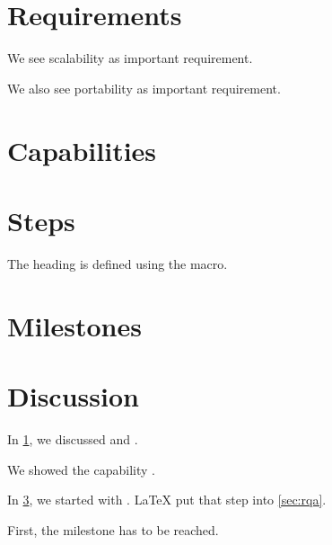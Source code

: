 \documentclass{article}
\begin{document}
\tableofcontents
\clearpage






\section{Requirements}
\label{secreqs}
We see scalability as important requirement.

We also see portability as important requirement.


\section{Capabilities}


\section{Steps}
\label{sec:steps}

\label{sec:rqa}
The heading is defined using the macro.

\section{Milestones}

\clearpage


\section{Discussion}
In \cref{secreqs}, we discussed  and .

We showed the capability .

In \cref{sec:steps}, we started with .
\LaTeX{} put that step into \cref{sec:rqa}.

First, the milestone  has to be reached.
\end{document}
